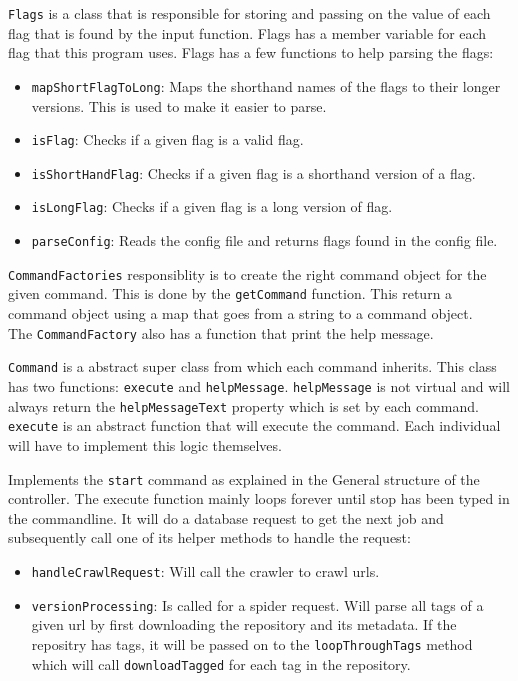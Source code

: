 \documentclass[../Main.tex]{subfiles}
\begin{document}
\texttt{Flags} is a class that is responsible for storing and passing on the value of each flag that is found by the input function. Flags has a member variable for each flag that this program uses. Flags has a few functions to help parsing the flags:
\begin{itemize}
    \item \texttt{mapShortFlagToLong}: Maps the shorthand names of the flags to their longer versions. This is used to make it easier to parse.
    \item \texttt{isFlag}: Checks if a given flag is a valid flag.
    \item \texttt{isShortHandFlag}: Checks if a given flag is a shorthand version of a flag.
    \item \texttt{isLongFlag}: Checks if a given flag is a long version of flag.
    \item \texttt{parseConfig}: Reads the config file and returns flags found in the config file.
\end{itemize}

\texttt{CommandFactories} responsiblity is to create the right command object for the given command. This is done by the \texttt{getCommand} function. This return a command object using a map that goes from a string to a command object.\\
The \texttt{CommandFactory} also has a function that print the help message.

\texttt{Command} is a abstract super class from which each command inherits. This class has two functions: \texttt{execute} and \texttt{helpMessage}. \texttt{helpMessage} is not virtual and will always return the \texttt{helpMessageText} property which is set by each command. \texttt{execute} is an abstract function that will execute the command. Each individual will have to implement this logic themselves.

Implements the \texttt{start} command as explained in the General structure of the controller. The execute function mainly loops forever until stop has been typed in the commandline. It will do a database request to get the next job and subsequently call one of its helper methods to handle the request:
\begin{itemize}
    \item \texttt{handleCrawlRequest}: Will call the crawler to crawl urls.
    \item \texttt{versionProcessing}: Is called for a spider request. Will parse all tags of a given url by first downloading the repository and its metadata. If the repositry has tags, it will be passed on to the \texttt{loopThroughTags} method which will call \texttt{downloadTagged} for each tag in the repository.
\end{itemize}
\end{document}
